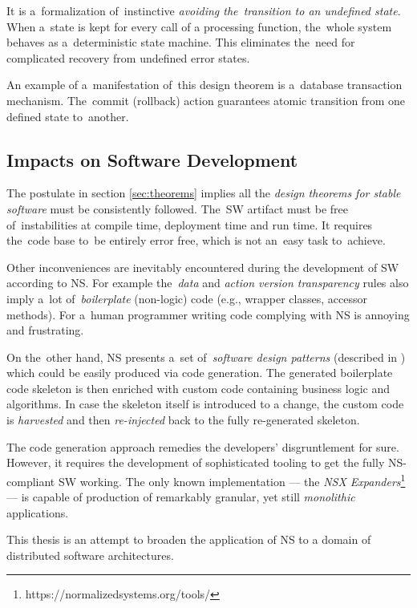 \documentclass[thesis=M,english,hidelinks]{FITthesis}[2012/10/20]
\begin{document}
It is a~formalization of~instinctive \emph{avoiding the~transition to an undefined state}. When a~state is kept for every call of a processing function, the~whole system behaves as a~deterministic state machine. This eliminates the~need for complicated recovery from undefined error states.

An example of a~manifestation of~this design theorem is a~database transaction mechanism. The~commit (rollback) action guarantees atomic transition from one defined state to~another.

\subsection{Impacts on Software Development}
\label{sec:ns-impacts}
The postulate in section \ref{sec:theorems} implies all the \textit{design theorems for stable software} must be consistently followed. The~\acrshort{SW} artifact must be free of~instabilities at compile time, deployment time and run time. It requires the~code base to~be entirely error free, which is not an~easy task to~achieve.

Other inconveniences are inevitably encountered during the development of \acrshort{SW} according to \acrshort{NS}. For example the~\emph{data} and \emph{action version transparency} rules also imply a~lot of~\textit{boilerplate} (non-logic) code (e.g., wrapper classes, accessor methods). For a~human programmer writing code complying with \acrshort{NS} is annoying and frustrating.

On the~other hand, \acrshort{NS} presents a~set of~\emph{software design patterns} (described in \cite{ns-recreating}) which could be easily produced via code generation. The generated boilerplate code skeleton is then enriched with custom code containing business logic and algorithms. In case the skeleton itself is introduced to a change, the custom code is \textit{harvested} and then \textit{re-injected} back to the fully re-generated skeleton.~\cite{vk-bp}

The code generation approach remedies the developers' disgruntlement for sure. However, it requires the development of sophisticated tooling to get the fully \acrshort{NS}-compliant \acrlong{SW} working. The only known implementation --- the \textit{NSX Expanders}\footnote{https://normalizedsystems.org/tools/} --- is capable of production of remarkably granular, yet still \textit{monolithic} applications.

This thesis is an attempt to broaden the application of \acrlong{NS} to a domain of distributed software architectures.
\end{document}
